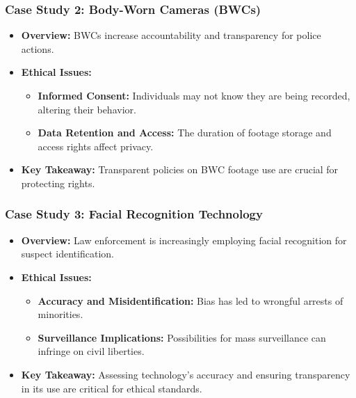\documentclass[aspectratio=169]{beamer}
\begin{document}
\begin{frame}[fragile]
    \frametitle{Case Study 2: Body-Worn Cameras (BWCs)}
    \begin{itemize}
        \item \textbf{Overview:} BWCs increase accountability and transparency for police actions.
        \item \textbf{Ethical Issues:}
        \begin{itemize}
            \item \textbf{Informed Consent:} Individuals may not know they are being recorded, altering their behavior.
            \item \textbf{Data Retention and Access:} The duration of footage storage and access rights affect privacy.
        \end{itemize}
        \item \textbf{Key Takeaway:} Transparent policies on BWC footage use are crucial for protecting rights.
    \end{itemize}
\end{frame}

\begin{frame}[fragile]
    \frametitle{Case Study 3: Facial Recognition Technology}
    \begin{itemize}
        \item \textbf{Overview:} Law enforcement is increasingly employing facial recognition for suspect identification.
        \item \textbf{Ethical Issues:}
        \begin{itemize}
            \item \textbf{Accuracy and Misidentification:} Bias has led to wrongful arrests of minorities.
            \item \textbf{Surveillance Implications:} Possibilities for mass surveillance can infringe on civil liberties.
        \end{itemize}
        \item \textbf{Key Takeaway:} Assessing technology's accuracy and ensuring transparency in its use are critical for ethical standards.
    \end{itemize}
\end{frame}
\end{document}
